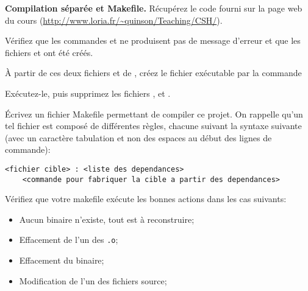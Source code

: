 \documentclass[10pt]{article}\usepackage[nu]{esial}
\begin{document}
\Exercice\textbf{Compilation séparée et Makefile.}
Récupérez le code fourni sur la page web du cours
(\url{http://www.loria.fr/~quinson/Teaching/CSH/}).

\Question Vérifiez que les commandes  et  ne produisent pas de message d'erreur et que les fichiers
 et  ont été créés.

\Question À partir de ces deux fichiers et de , créez le fichier
exécutable  par la commande 

\Question Exécutez-le, puis supprimez les fichiers ,
 et .


\Question Écrivez un fichier Makefile permettant de compiler ce projet. On
rappelle qu'un tel fichier est composé de différentes règles, chacune suivant
la syntaxe suivante (avec un caractère tabulation et non des espaces au début
des lignes de commande):
\begin{Verbatim}
<fichier cible> : <liste des dependances>
	<commande pour fabriquer la cible a partir des dependances>  
\end{Verbatim}

\Question Vérifiez que votre makefile exécute les bonnes actions dans les cas
suivants:
\begin{itemize}
\item Aucun binaire n'existe, tout est à reconstruire;
\item Effacement de l'un des \texttt{.o};
\item Effacement du binaire;
\item Modification de l'un des fichiers source;
\end{itemize}
\end{document}
